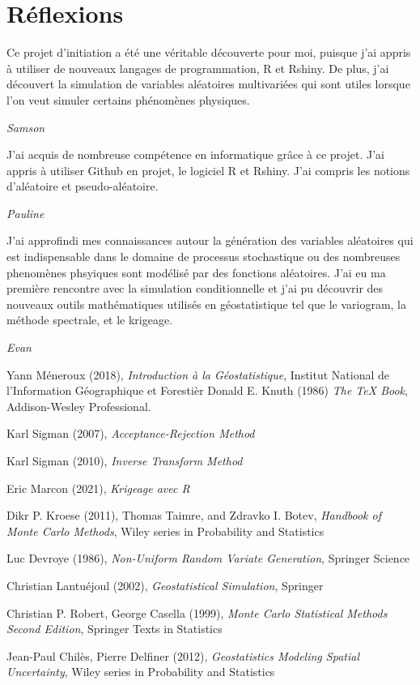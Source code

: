 \documentclass[10pt]{article} %
\begin{document}
\section{Réflexions}

\renewcommand {\epigraphflush} {flushleft}
\epigraph{Ce projet d'initiation a été une véritable découverte pour moi, puisque j'ai appris à
 utiliser de nouveaux langages de programmation, R et Rshiny. De plus, j'ai découvert la
  simulation de variables aléatoires multivariées qui sont utiles
lorsque l'on veut simuler certains phénomènes physiques.} {\textit{Samson}}

\epigraph{J'ai acquis de nombreuse compétence en informatique grâce à ce projet. J'ai appris à utiliser Github en projet,
le logiciel R et Rshiny. J'ai compris les notions d'aléatoire et pseudo-aléatoire.}
 {\textit{Pauline}}

\epigraph{J'ai approfindi mes connaissances autour la génération des variables aléatoires qui est indispensable dans le domaine
de processus stochastique ou des nombreuses phenomènes phsyiques sont modélisé par des fonctions aléatoires. J'ai eu ma première rencontre
avec la simulation conditionnelle et j'ai pu découvrir des nouveaux outils mathématiques utilisés en géostatistique tel que le variogram, la méthode spectrale,
et le krigeage.}
 {\textit{Evan}}


\newpage

\begin{thebibliography}{9}
    Yann Méneroux (2018), \emph{Introduction à la Géostatistique}, Institut National de l'Information Géographique et Forestièr
    Donald E. Knuth (1986) \emph{The \TeX{} Book}, Addison-Wesley Professional.

    Karl Sigman (2007), \emph{Acceptance-Rejection Method}

    Karl Sigman (2010), \emph{Inverse Transform Method}

    Eric Marcon (2021), \emph{Krigeage avec R}

    Dikr P. Kroese (2011), Thomas Taimre, and Zdravko I. Botev, \emph{Handbook of Monte Carlo Methods}, Wiley series in Probability and Statistics

    Luc Devroye (1986), \emph{Non-Uniform Random Variate Generation}, Springer Science

    Christian Lantuéjoul (2002), \emph{Geostatistical Simulation}, Springer

    Christian P. Robert, George Casella (1999), \emph{Monte Carlo Statistical Methods Second Edition}, Springer Texts in Statistics

    Jean-Paul Chilès, Pierre Delfiner (2012), \emph{Geostatistics Modeling Spatial Uncertainty}, Wiley series in Probability and Statistics

    \end{thebibliography}
\end{document}
